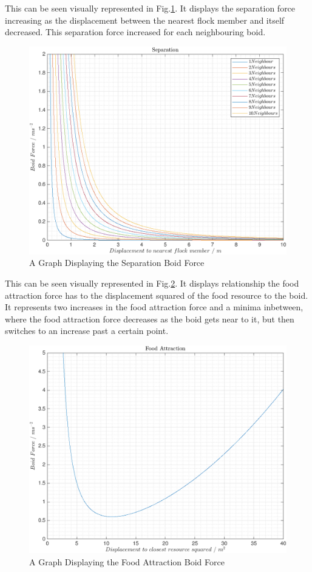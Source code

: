 This can be seen visually represented in Fig.\ref{fig:separation}. It displays the separation force increasing as the displacement between the nearest flock member and itself decreased. This separation force increased for each neighbouring boid.
\begin{figure}[H]
	\includegraphics[width=\linewidth]{../Images/separation.png}
	\caption{A Graph Displaying the Separation Boid Force}
	\label{fig:separation}
\end{figure}

This can be seen visually represented in Fig.\ref{fig:foodattraction}. It displays relationship the food attraction force has to the displacement squared of the food resource to the boid. It represents two increases in the food attraction force and a minima inbetween, where the food attraction force decreases as the boid gets near to it, but then switches to an increase past a certain point.
\begin{figure}[H]
	\includegraphics[width=\linewidth]{../Images/foodattraction.png}
	\caption{A Graph Displaying the Food Attraction Boid Force}
	\label{fig:foodattraction}
\end{figure}

